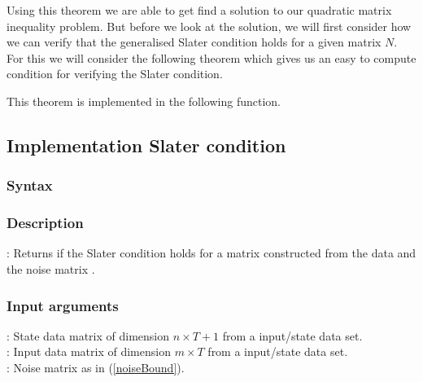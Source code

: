 Using this theorem we are able to get find a solution to our quadratic matrix inequality problem. But before we look at the solution, we will first consider how we can verify that the generalised Slater condition holds for a given matrix $N$. For this we will consider the following theorem which gives us an easy to compute condition for verifying the Slater condition.




This theorem is implemented in the following function.

\subsection{Implementation Slater condition}
\subsubsection*{Syntax}

\subsubsection*{Description}
: Returns if the Slater condition holds for a matrix  constructed from the data  and the noise matrix .

\subsubsection*{Input arguments}
\textbf{}: State data matrix of dimension $n \times T+1$ from a input/state data set.\\
\textbf{}: Input data matrix of dimension $m \times T$ from a input/state data set.\\
\textbf{}: Noise matrix as in (\ref{noiseBound}).

